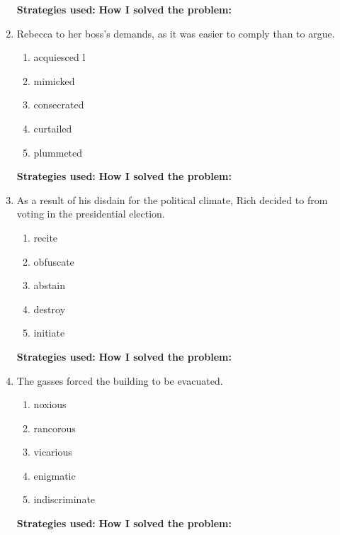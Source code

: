 \begin{enumerate}
\large{\textbf{Strategies used:}} \hrulefill
\large{\textbf{How I solved the problem:}} \hrulefill

\item Rebecca \underline{\hspace{2in}} to her boss’s demands, as it was easier to comply than to argue.

\begin{enumerate} [label=(\Alph*)]
\item acquiesced l
\item mimicked  
\item consecrated 
\item curtailed
\item plummeted
\end{enumerate}

\large{\textbf{Strategies used:}} \hrulefill
\large{\textbf{How I solved the problem:}} \hrulefill

\item As a result of his disdain for the political climate, Rich decided to \underline{\hspace{2in}} from voting in the presidential election.

\begin{enumerate} [label=(\Alph*)]
\item recite
\item obfuscate
\item abstain
\item destroy
\item initiate
\end{enumerate}

\large{\textbf{Strategies used:}} \hrulefill
\large{\textbf{How I solved the problem:}} \hrulefill

\item The \underline{\hspace{2in}} gasses forced the building to be evacuated.

\begin{enumerate} [label=(\Alph*)]
\item noxious
\item rancorous
\item vicarious
\item enigmatic
\item indiscriminate
\end{enumerate}

\large{\textbf{Strategies used:}} \hrulefill
\large{\textbf{How I solved the problem:}} \hrulefill

\end{enumerate}

